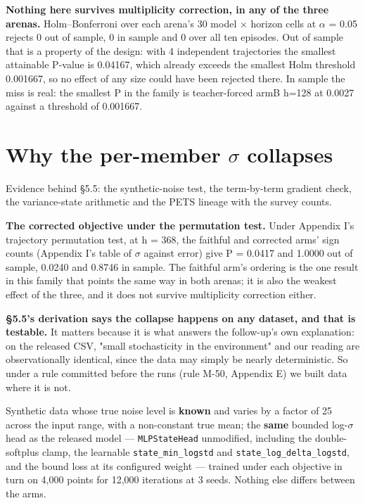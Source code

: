 \documentclass[10pt]{article}
\begin{document}
\textbf{Nothing here survives multiplicity correction, in any of the three arenas.} Holm--Bonferroni over each arena's 30 model $\times$ horizon cells at $\alpha$ = 0.05 rejects 0 out of sample, 0 in sample and 0 over all ten episodes. Out of sample that is a property of the design: with 4 independent trajectories the smallest attainable P-value is 0.04167, which already exceeds the smallest Holm threshold 0.001667, so no effect of any size could have been rejected there. In sample the miss is real: the smallest P in the family is teacher-forced armB h=128 at 0.0027 against a threshold of 0.001667.


\section{Why the per-member $\sigma$ collapses}

Evidence behind \S{}5.5: the synthetic-noise test, the term-by-term gradient check, the variance-state arithmetic and the PETS lineage with the survey counts.

\textbf{The corrected objective under the permutation test.} Under Appendix I's trajectory permutation test, at h = 368, the faithful and corrected arms' sign counts (Appendix I's table of $\sigma$ against error) give P = 0.0417 and 1.0000 out of sample, 0.0240 and 0.8746 in sample. The faithful arm's ordering is the one result in this family that points the same way in both arenas; it is also the weakest effect of the three, and it does not survive multiplicity correction either.

\textbf{\S{}5.5's derivation says the collapse happens on any dataset, and that is testable.} It matters because it is what answers the follow-up's own explanation: on the released CSV, "small stochasticity in the environment" and our reading are observationally identical, since the data may simply be nearly deterministic. So under a rule committed before the runs (rule M-50, Appendix E) we built data where it is not.

Synthetic data whose true noise level is \textbf{known} and varies by a factor of 25 across the input range, with a non-constant true mean; the \textbf{same} bounded log-$\sigma$ head as the released model --- \texttt{MLPStateHead} unmodified, including the double-softplus clamp, the learnable \texttt{state\_min\_logstd} and \texttt{state\_log\_delta\_logstd}, and the bound loss at its configured weight --- trained under each objective in turn on 4,000 points for 12,000 iterations at 3 seeds. Nothing else differs between the arms.
\end{document}
